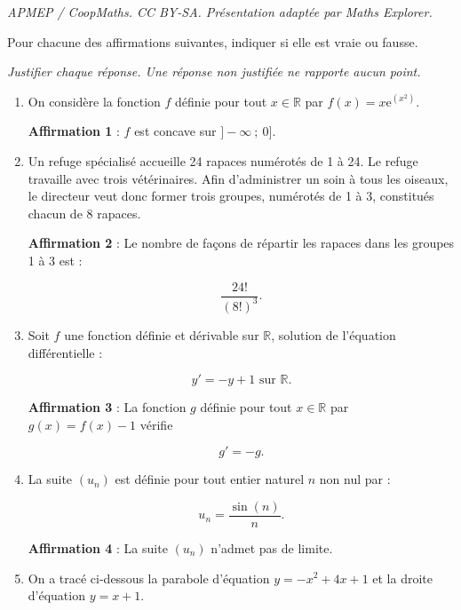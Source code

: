 \documentclass[10pt]{article}
\providecommand{\e}{{\mathrm{e}}}
\begin{document}
\noindent\textit{APMEP / CoopMaths. CC BY-SA. Présentation adaptée par Maths Explorer.}\par\medskip
Pour chacune des affirmations suivantes, indiquer si elle est vraie ou fausse.

\emph{Justifier chaque réponse. Une réponse non justifiée ne rapporte aucun point.}

\medskip

\begin{enumerate}
\item On considère la fonction $f$ définie pour tout $x \in \mathbb{R}$ par $f(x) = x \e^{(x^2)}$.

\textbf{Affirmation 1} : $f$ est concave sur $]-\infty~;~0]$.

\item Un refuge spécialisé accueille 24 rapaces numérotés de 1 à 24. Le refuge travaille avec trois vétérinaires. Afin d'administrer un soin à tous les oiseaux, le directeur veut donc former trois groupes, numérotés de 1 à 3, constitués chacun de 8 rapaces.

\textbf{Affirmation 2} : Le nombre de façons de répartir les rapaces dans les groupes 1 à 3 est :

\[\frac{24!}{(8!)^3}.\]

\item Soit $f$ une fonction définie et dérivable sur $\mathbb{R}$, solution de l'équation différentielle :

\[y' = -y + 1 \text{ sur } \mathbb{R}.\]

\textbf{Affirmation 3} : La fonction $g$ définie pour tout $x \in \mathbb{R}$ par $g(x) = f(x) - 1$ vérifie

\[g' = -g.\]

\item La suite $(u_n)$ est définie pour tout entier naturel $n$ non nul par :

\[u_n = \frac{\sin(n)}{n}.\]

\textbf{Affirmation 4} : La suite $(u_n)$ n'admet pas de limite.

\item On a tracé ci-dessous la parabole d'équation $y = -x^2 + 4x + 1$ et la droite d'équation $y = x + 1$.

\begin{center}



















\end{center}
\end{enumerate}
\end{document}
